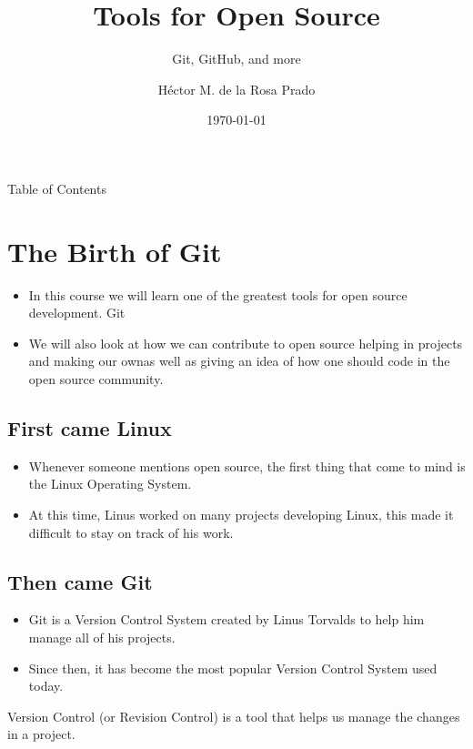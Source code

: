 \documentclass{beamer}
\title{Tools for Open Source}
\subtitle{Git, GitHub, and more}
\author{Héctor M. de la Rosa Prado}
\institute{Universidad Nacional Autónoma de México}
\date{\today}
\begin{document}
\begin{frame}
\titlepage
\end{frame}
\begin{frame}{Table of Contents}
\setcounter{tocdepth}{1}
\tableofcontents
\end{frame}

\section{The Birth of Git}
\begin{frame}

\begin{itemize}
\item In this course we will learn one of the greatest tools for open source 
development. \pause Git \pause
\item We will also look at how we can contribute to open source helping in 
projects and making our own\pause as well as giving an idea of how one should 
code in the open source community.
\end{itemize}

\end{frame}

\subsection{First came Linux}
\begin{frame}
\begin{itemize}
\item Whenever someone mentions open source, the first thing that come to mind 
is the Linux Operating System.
\item At this time, Linus worked on many projects developing Linux, this made 
it difficult to stay on track of his work.

\end{itemize}

\end{frame}

\subsection{Then came Git}
\begin{frame}

\begin{itemize}
\item Git is a Version Control System created by Linus Torvalds to help him 
manage all of his projects.
\item Since then, it has become the most popular Version Control System used 
today.\pause
\end{itemize}

\begin{definition}
Version Control (or Revision Control) is a tool that helps us manage the 
changes in a project.
\end{definition}
\end{frame}
\end{document}
